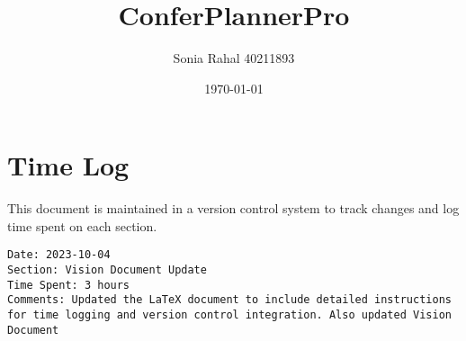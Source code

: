 \documentclass{article}
\begin{document}
\title{ConferPlannerPro}
\author{Sonia Rahal 40211893}
\date{\today}
\maketitle

\section{Time Log}
This document is maintained in a version control system to track changes and log time spent on each section.
\begin{verbatim}
Date: 2023-10-04
Section: Vision Document Update
Time Spent: 3 hours
Comments: Updated the LaTeX document to include detailed instructions for time logging and version control integration. Also updated Vision Document
\end{verbatim}

\end{document}
